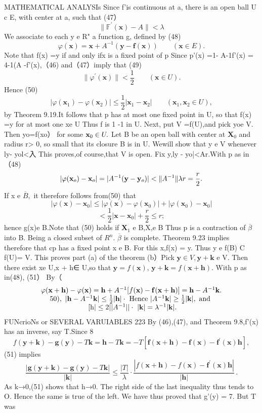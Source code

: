 MATHEMATICAL ANALYSIs Since f'is continuous at a, there is an open ball U c E, with center at a, such that (47） $$ \|\mathbb{F}^{\prime}(\mathbf{x})-A\|<\lambda $$ We associate to each y e R" a function g, defined by (48) $$ \varphi(\mathbf{x})=\mathbf{x}+A^{-1}(\mathbf{y}-\mathbf{f}(\mathbf{x}))\qquad(\mathbf{x}\in E). $$ Note that f(x) =y if and only ifx is a fixed point of p Since p'(x) =1- A-1f'(x) = 4-1(A -f'(x),（46) and（47）imply that (49) $$ \|\varphi^{\prime}(\mathbf{x})\|<{\frac{1}{2}}\qquad(\mathbf{x}\in U). $$ Hence (50) $$ |\varphi(\mathbf{x}_{1})-\varphi(\mathbf{x}_{2})|\leq{\frac{1}{2}}|\mathbf{x}_{1}-\mathbf{x}_{2}|\qquad(\mathbf{x}_{1},\mathbf{x}_{2}\in U), $$ by Theorem 9.19.It follows that p has at most one fixed point in U, so that f(x) =y for at most one xe U Thus f is 1 -1 in U. Next, put V =f(U),and pick yoe V. Then yo=f(xo） for some ${\bf x}_{0}\in U.$ Let B be an open ball with center at $\mathbf{X}_{\mathrm{0}}$ and radius r> 0, so small that its closure B is in U. Wewill show that y e V whenever ly- yol<入 This proves,of course,that V is open. Fix y,ly - yo|<Ar.With p as in（48) $$ |\varphi({\bf x}_{o})-{\bf x}_{o}|=|A^{-1}({\bf y}-{\bf y}_{o})|<\|A^{-1}\|\lambda r=\frac{r}{2}. $$ If x e ${\overline{{B}}},$ it therefore follows from(50) that $$ |\varphi(\mathbf{x})-\mathbf{x}_{0}|\leq|\varphi(\mathbf{x})-\varphi(\mathbf{x}_{0})|+|\varphi(\mathbf{x}_{0})-\mathbf{x}_{0}| $$ $$ <\frac{1}{2}\left|\mathbf{x}-\mathbf{x}_{0}\right|+\frac{r}{2}\leq r; $$ hence g(x)e B.Note that (50) holds if $\mathbf{X}_{1}$ e B,X,e B Thus p is a contraction of $\overline{{\beta}}$ into B. Being a closed subset of $\textstyle R^{n}\!.$ $\overline{{\beta}}$ is complete. Theorem 9.23 implies therefore that cp has a fixed point x e B. For this x,f(x) = y. Thus y e f(B) C f(U)= V. This proves part (a) of the theorem (b）Pick $\mathbf{y}\in V,\mathbf{y}+\mathbf{k}$ e V. Then there exist xe U,x + h∈ U,so that $\mathbf{y}=f(\mathbf{x}),\,\mathbf{y}+\mathbf{k}=f(\mathbf{x}+\mathbf{h}).$ With p as in(48), (51） By（ $$ \begin{array}{c}{{\varphi({\bf x}+{\bf h})-\varphi({\bf x})={\bf h}+A^{-1}[f({\bf x})-{\bf f}({\bf x}+{\bf h})]={\bf h}-A^{-1}{\bf k}.}}\\ {{50),\ |{\bf h}-A^{-1}{\bf k}|\leq\frac{1}{2}|{\bf h}|\cdot\mathrm{~Hence~}|A^{-1}{\bf k}|\geq\frac{1}{2}|{\bf k}|,\mathrm{~and~}}}\\ {{\mathrm{~[h}|\leq2||A^{-1}||\cdot\mathrm{~}|{\bf k}|=\lambda^{-1}|{\bf k}|.}}\end{array} $$FUNcrioNs or SEVERAL VARUIABLES 223 By (46),(47), and Theorem 9.8,f'(x) has an inverse, say T.Since 8 $$ f(\mathbf{y}+\mathbf{k})-\mathbf{g}(\mathbf{y})-T\mathbf{k}=\mathbf{h}-T\mathbf{k}=-T[\mathbf{f}(\mathbf{x}+\mathbf{h})-\mathbf{f}(\mathbf{x})-\mathbf{f}^{\prime}(\mathbf{x})\mathbf{h}], $$ (51) implies $$ {\frac{|\mathbf{g}(\mathbf{y}+\mathbf{k})-\mathbf{g}(\mathbf{y})-T\mathbf{k}|}{|\mathbf{k}|}}\leq{\frac{|T|}{\lambda}}\cdot{\frac{|f(\mathbf{x}+\mathbf{h})-f(\mathbf{x})-\mathbf{f}^{\prime}(\mathbf{x})\mathbf{h}|}{|\mathbf{h}|}}\,. $$ As k→0,(51) shows that h→0. The right side of the last inequality thus tends to O. Hence the same is true of the left. We have thus proved that g'(y) = 7. But T was 
